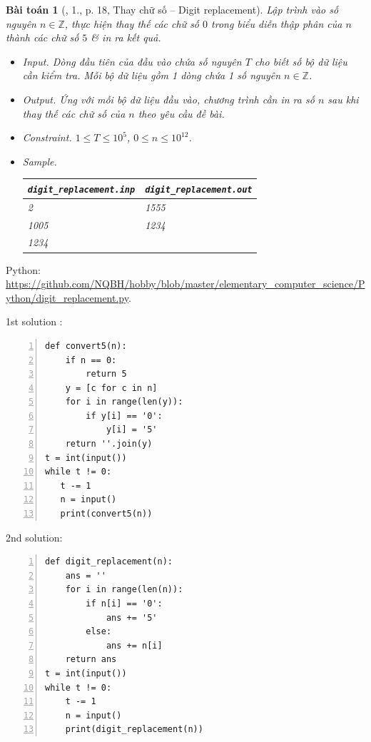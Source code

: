 \documentclass{article}
\newtheorem{baitoan}{Bài toán}
\begin{document}
\begin{baitoan}[\cite{Duc_200_BT_Python}, 1., p. 18, Thay chữ số -- Digit replacement]
    Lập trình vào số nguyên $n\in\mathbb{Z}$, thực hiện thay thế các chữ số $0$ trong biểu diễn thập phân của $n$ thành các chữ số $5$ \& in ra kết quả.
    \begin{itemize}
        \item {\sf Input.} Dòng đầu tiên của đầu vào chứa số nguyên $T$ cho biết số bộ dữ liệu cần kiểm tra. Mỗi bộ dữ liệu gồm 1 dòng chứa 1 số nguyên $n\in\mathbb{Z}$.
        \item {\sf Output.} Ứng với mỗi bộ dữ liệu đầu vào, chương trình cần in ra số $n$ sau khi thay thế các chữ số của $n$ theo yêu cầu đề bài.
        \item {\sf Constraint.} $1\le T\le10^5$, $0\le n\le10^{12}$.
        \item {\sf Sample.}
        \begin{table}[H]
            \centering
            \begin{tabular}{|l|l|}
                \hline
                \verb|digit_replacement.inp| & \verb|digit_replacement.out| \\
                \hline
                2 & 1555 \\
                1005 & 1234 \\
                1234 &  \\
                \hline
            \end{tabular}
        \end{table}
    \end{itemize}
\end{baitoan}
Python: \url{https://github.com/NQBH/hobby/blob/master/elementary_computer_science/Python/digit_replacement.py}.
\begin{multicols}{2}
	1st solution \cite[1., p. 202]{Duc_200_BT_Python}:
\begin{Verbatim}[numbers=left,xleftmargin=5mm]
def convert5(n):
    if n == 0:
        return 5
    y = [c for c in n]
    for i in range(len(y)):
        if y[i] == '0':
            y[i] = '5'
    return ''.join(y)
t = int(input())
while t != 0:
   t -= 1
   n = input()
   print(convert5(n))
\end{Verbatim}
\columnbreak
	2nd solution:
\begin{Verbatim}[numbers=left,xleftmargin=5mm]
def digit_replacement(n):
    ans = ''
    for i in range(len(n)):
        if n[i] == '0':
            ans += '5'
        else:
            ans += n[i]
    return ans
t = int(input())
while t != 0:
    t -= 1
    n = input()
    print(digit_replacement(n))
\end{Verbatim}
\end{multicols}
\end{document}
